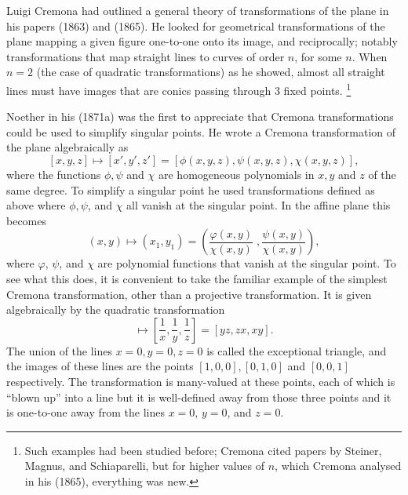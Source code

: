 Luigi Cremona
%
had  outlined a general theory of transformations of
the plane in his papers (1863) and (1865). He looked for geometrical
transformations of the plane mapping a given figure one-to-one onto its
image, and reciprocally; notably  transformations that map straight lines
to curves of order $n$, for some $n$. When $n=2$ (the case of quadratic
transformations)  as he showed, almost all straight lines must have
images that are conics passing through 3 fixed points.%
%
\footnote{Such
examples had been studied before; Cremona  cited papers by Steiner,
%
%
Magnus, and Schiaparelli,
%
 but for higher values of $n$, which Cremona
analysed in his (1865), everything was new.}



Noether in his (1871a) was the first to appreciate that Cremona
transformations could be used to simplify singular points.  He wrote a
Cremona transformation of the plane algebraically as
$$
[x,y,z] \mapsto [x',y',z'] = [\phi (x,y,z), \psi (x, y, z),  \chi (x,
y, z)],
$$
where the functions $\phi, \psi$ and $\chi$ are homogeneous polynomials
in $x, y$ and $z$ of the same degree. To simplify a singular point he used
transformations defined as above where $\phi, \psi$, and $\chi$ all
vanish at the singular point.  In the affine plane this becomes
$$(x , y) \mapsto (x_1 , y_1) = \left(\frac{\varphi (x, y)}{\chi (x,
y)}\;,  \frac{\psi (x, y)}{\chi (x, y)} \right),$$
where $\varphi$, $\psi$, and $\chi$ are polynomial functions that vanish
at the singular point.  To see what this does, it is convenient to take
the familiar example of
the simplest  Cremona transformation,
%
%
 other than a projective
transformation. It  is given algebraically by  the quadratic
transformation
\begin{equation*}
[x, y, z] \mapsto \left[\frac{1}{x}, \frac{1}{y}, \frac{1}{z}\right] =
[yz, zx, xy]
.
\end{equation*}
The union of the lines $x=0,y=0,z=0$ is called the exceptional triangle,
and the images of these lines are the points $[1, 0, 0], [0, 1, 0]$
and $[0, 0, 1]$ respectively.
The transformation is many-valued at these points, each of which is
%
``blown up'' into a line  but it is well-defined away from those three
points and it is  one-to-one away from  the lines $x=0$, $y=0$, and $z
= 0$.


